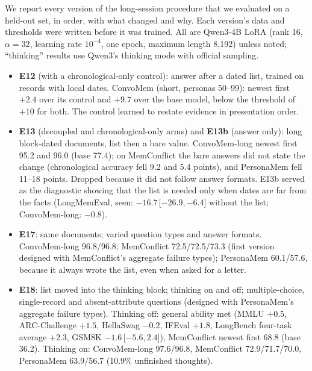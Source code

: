 \documentclass[11pt]{article}
\newcommand{\ci}[2]{\,[$#1$,\,$#2$]}
\begin{document}
We report every version of the long-session procedure that we evaluated on a held-out set, in order, with what changed and why. Each version's data and thresholds were written before it was trained. All are Qwen3-4B LoRA (rank 16, $\alpha=32$, learning rate $10^{-4}$, one epoch, maximum length 8{,}192) unless noted; ``thinking'' results use Qwen3's thinking mode with official sampling.
\begin{itemize}
  \item \textbf{E12} (with a chronological-only control): answer after a dated list, trained on records with local dates. ConvoMem (short, personas 50--99): newest first $+2.4$ over its control and $+9.7$ over the base model, below the threshold of $+10$ for both. The control learned to restate evidence in presentation order.
  \item \textbf{E13} (decoupled and chronological-only arms) and \textbf{E13b} (answer only): long block-dated documents, list then a bare value. ConvoMem-long newest first 95.2 and 96.0 (base 77.4); on MemConflict the bare answers did not state the change (chronological accuracy fell 9.2 and 5.4 points), and PersonaMem fell 11--18 points. Dropped because it did not follow answer formats. E13b served as the diagnostic showing that the list is needed only when dates are far from the facts (LongMemEval, seen: $-16.7$\ci{-26.9}{-6.4} without the list; ConvoMem-long: $-0.8$).
  \item \textbf{E17}: same documents; varied question types and answer formats. ConvoMem-long 96.8/96.8; MemConflict 72.5/72.5/73.3 (first version designed with MemConflict's aggregate failure types); PersonaMem 60.1/57.6, because it always wrote the list, even when asked for a letter.
  \item \textbf{E18}: list moved into the thinking block; thinking on and off; multiple-choice, single-record and absent-attribute questions (designed with PersonaMem's aggregate failure types). Thinking off: general ability met (MMLU $+0.5$, ARC-Challenge $+1.5$, HellaSwag $-0.2$, IFEval $+1.8$, LongBench four-task average $+2.3$, GSM8K $-1.6$\ci{-5.6}{2.4}), MemConflict newest first 68.8 (base 36.2). Thinking on: ConvoMem-long 97.6/96.8, MemConflict 72.9/71.7/70.0, PersonaMem 63.9/56.7 (10.9\% unfinished thoughts).

\end{itemize}
\end{document}
